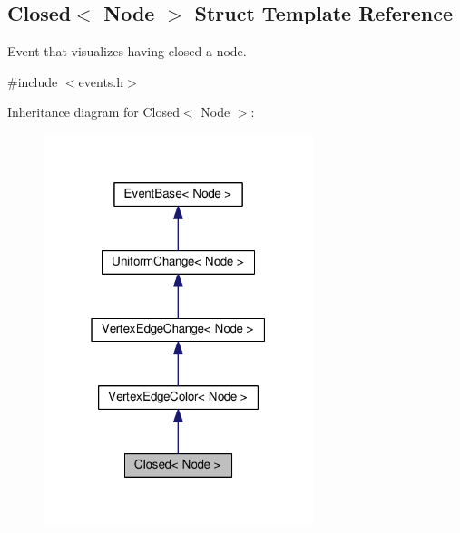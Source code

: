 \hypertarget{structClosed}{}\subsection{Closed$<$ Node $>$ Struct Template Reference}
\label{structClosed}


Event that visualizes having closed a node.  




{\ttfamily \#include $<$events.\+h$>$}



Inheritance diagram for Closed$<$ Node $>$\+:\nopagebreak
\begin{figure}[H]
\begin{center}
\leavevmode
\includegraphics[width=223pt]{structClosed__inherit__graph}
\end{center}
\end{figure}


